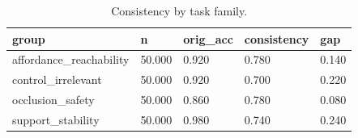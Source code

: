 \begin{table}[t]
\centering
\begin{tabular}{lllll}
\toprule
group & n & orig_acc & consistency & gap \\
\midrule
affordance_reachability & 50.000 & 0.920 & 0.780 & 0.140 \\
control_irrelevant & 50.000 & 0.920 & 0.700 & 0.220 \\
occlusion_safety & 50.000 & 0.860 & 0.780 & 0.080 \\
support_stability & 50.000 & 0.980 & 0.740 & 0.240 \\
\bottomrule
\end{tabular}
\caption{Consistency by task family.}
\end{table}

